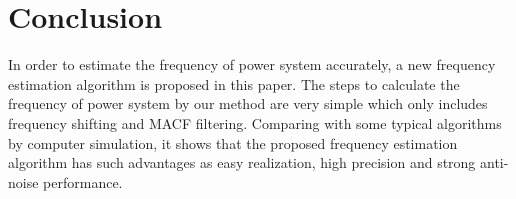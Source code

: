 \documentclass[journal,twoside]{IEEEtran}
\begin{document}
\section{Conclusion}
In order to estimate the frequency of power system accurately, a new frequency estimation algorithm is proposed in this paper. The steps to calculate the frequency of power system by our method are very simple which only includes frequency shifting and MACF filtering. Comparing with some typical algorithms by computer simulation, it shows that the proposed frequency estimation algorithm has such advantages as easy realization, high precision and strong anti-noise performance.




%
%
%
%
%
%
%
%	
\end{document}

